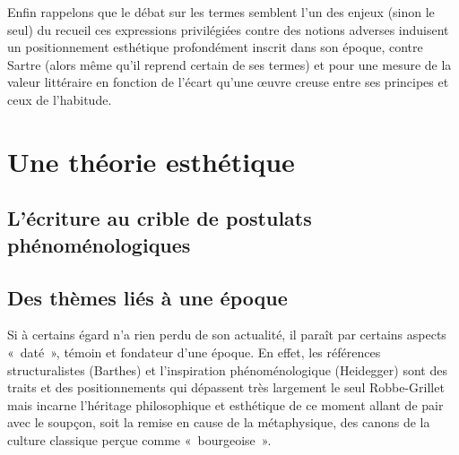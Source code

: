 \documentclass[12pt, a4paper]{article}
\begin{document}


Enfin rappelons que le débat sur les termes semblent l'un des enjeux (sinon le seul) du recueil ces expressions privilégiées contre des notions adverses induisent un positionnement esthétique profondément inscrit dans son époque, contre Sartre (alors même qu'il reprend certain de ses termes) et pour une mesure de la valeur littéraire en fonction de l'écart qu'une œuvre creuse entre ses principes et ceux de l'habitude.


\newpage

\section{Une théorie esthétique}

\subsection{L'écriture au crible de postulats phénoménologiques}
\label{3phéno}





\subsection{Des thèmes liés à une époque}

Si à certains égard \punr{} n'a rien perdu de son actualité, il paraît par certains aspects «~daté~», témoin et fondateur d'une époque. En effet, les références structuralistes (Barthes) et l'inspiration phénoménologique (Heidegger) sont des traits et des positionnements qui dépassent très largement le seul Robbe-Grillet mais incarne l'héritage philosophique et esthétique de ce moment allant de pair avec le soupçon, soit la remise en cause de la métaphysique, des canons de la culture classique perçue comme «~bourgeoise~». %
\end{document}
